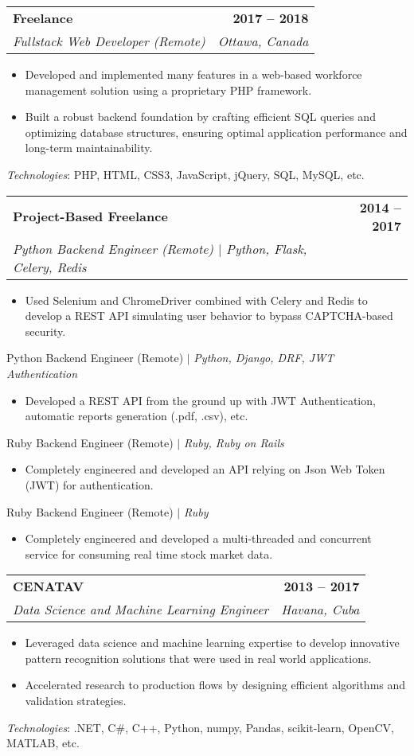 \documentclass[letterpaper,11pt]{article}
\makeatletter
\newcommand{\resumeItem}[1]{
  \item\small{
    {#1 \vspace{-2pt}}
  }
}
\newcommand{\resumeSubheading}[4]{
  \vspace{-2pt}\item
    \begin{tabular*}{1.0\textwidth}[t]{l@{\extracolsep{\fill}}r}
      \textbf{#1} & \textbf{\small #2} \\
      \textit{\small#3} & \textit{\small #4} \\
    \end{tabular*}\vspace{-7pt}
}
\newcommand{\resumeItemListStart}{\begin{itemize}}
\newcommand{\resumeItemListEnd}{\end{itemize}\vspace{-5pt}}
\makeatother
\begin{document}
    \resumeSubheading
      {Freelance}{2017 -- 2018}
      {Fullstack Web Developer (Remote)}{Ottawa, Canada}
      \resumeItemListStart
        \resumeItem{Developed and implemented many features in a web-based workforce management solution using a proprietary PHP framework.}
        \resumeItem{Built a robust backend foundation by crafting efficient SQL queries and optimizing database structures, ensuring optimal application performance and long-term maintainability.}
      \resumeItemListEnd
    \begin{itemize}[leftmargin=0.0in, label={}]
      \small{
        \item{
          \emph{Technologies}{: PHP, HTML, CSS3, JavaScript, jQuery, SQL, MySQL, etc.} \\
        }
      }
    \end{itemize}

    \resumeSubheading
      {Project-Based Freelance}{2014 -- 2017}
      {Python Backend Engineer (Remote) $|$ \emph{Python, Flask, Celery, Redis}}{}
      \resumeItemListStart
        \resumeItem{Used Selenium and ChromeDriver combined with Celery and Redis to develop a REST API simulating user behavior to bypass CAPTCHA-based security.}
      \resumeItemListEnd

      {Python Backend Engineer (Remote) $|$ \emph{Python, Django, DRF, JWT Authentication}}{}
      \vspace{-8pt}
      \resumeItemListStart
        \resumeItem{Developed a REST API from the ground up with JWT Authentication, automatic reports generation (.pdf, .csv), etc.}
      \resumeItemListEnd

      {Ruby Backend Engineer (Remote) $|$ \emph{Ruby, Ruby on Rails}}{}
      \vspace{-8pt}
      \resumeItemListStart
        \resumeItem{Completely engineered and developed an API relying on Json Web Token (JWT) for authentication.}
      \resumeItemListEnd

      {Ruby Backend Engineer (Remote) $|$ \emph{Ruby}}{}
      \vspace{-8pt}
      \resumeItemListStart
        \resumeItem{Completely engineered and developed a multi-threaded and concurrent service for consuming real time stock market data.}
      \resumeItemListEnd

      \resumeSubheading
      {CENATAV}{2013 -- 2017}
      {Data Science and Machine Learning Engineer}{Havana, Cuba}
      \resumeItemListStart
        \resumeItem{Leveraged data science and machine learning expertise to develop innovative pattern recognition solutions that were used in real world applications.}
        \resumeItem{Accelerated research to production flows by designing efficient algorithms and validation strategies.}
      \resumeItemListEnd
    \begin{itemize}[leftmargin=0.0in, label={}]
      \small{
        \item{
          \emph{Technologies}{: .NET, C\#, C++, Python, numpy, Pandas, scikit-learn, OpenCV, MATLAB, etc.} \\
        }
      }
    \end{itemize}
\end{document}
